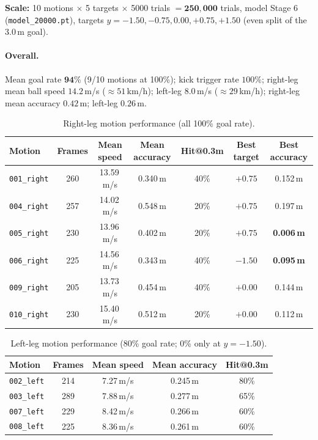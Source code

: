 \documentclass{article}
\newcommand{\code}[1]{\texttt{#1}}
\begin{document}
\textbf{Scale:} 10 motions $\times$ 5 targets $\times$ 5000 trials $=
\mathbf{250{,}000}$ trials, model Stage 6 (\code{model_20000.pt}), targets
$y=-1.50,-0.75,0.00,+0.75,+1.50$ (even split of the 3.0\,m goal).

\paragraph{Overall.} Mean goal rate $\mathbf{94\%}$ (9/10 motions at 100\%); kick
trigger rate $100\%$; right-leg mean ball speed $14.2$\,m/s ($\approx51$\,km/h);
left-leg $8.0$\,m/s ($\approx29$\,km/h); right-leg mean accuracy $0.42$\,m;
left-leg $0.26$\,m.

\begin{table}[h]
\centering\small
\caption{Right-leg motion performance (all 100\% goal rate).}
\begin{tabular}{@{}lcccccc@{}}
\toprule
Motion & Frames & Mean speed & Mean accuracy & Hit@0.3m & Best target & Best accuracy \\
\midrule
\code{001_right} & 260 & 13.59\,m/s & 0.340\,m & 40\% & $+0.75$ & 0.152\,m \\
\code{004_right} & 257 & 14.02\,m/s & 0.548\,m & 20\% & $+0.75$ & 0.197\,m \\
\code{005_right} & 230 & 13.96\,m/s & 0.402\,m & 20\% & \textbf{$+0.75$} & \textbf{0.006\,m} \\
\code{006_right} & 225 & 14.56\,m/s & 0.343\,m & 40\% & \textbf{$-1.50$} & \textbf{0.095\,m} \\
\code{009_right} & 205 & 13.73\,m/s & 0.454\,m & 40\% & $+0.00$ & 0.144\,m \\
\code{010_right} & 230 & 15.40\,m/s & 0.512\,m & 20\% & $+0.00$ & 0.112\,m \\
\bottomrule
\end{tabular}
\end{table}

\begin{table}[h]
\centering\small
\caption{Left-leg motion performance (80\% goal rate; 0\% only at $y=-1.50$).}
\begin{tabular}{@{}lcccc@{}}
\toprule
Motion & Frames & Mean speed & Mean accuracy & Hit@0.3m \\
\midrule
\code{002_left} & 214 & 7.27\,m/s & 0.245\,m & 80\% \\
\code{003_left} & 289 & 7.88\,m/s & 0.277\,m & 65\% \\
\code{007_left} & 229 & 8.42\,m/s & 0.266\,m & 60\% \\
\code{008_left} & 225 & 8.36\,m/s & 0.261\,m & 60\% \\
\bottomrule
\end{tabular}
\end{table}
\end{document}
